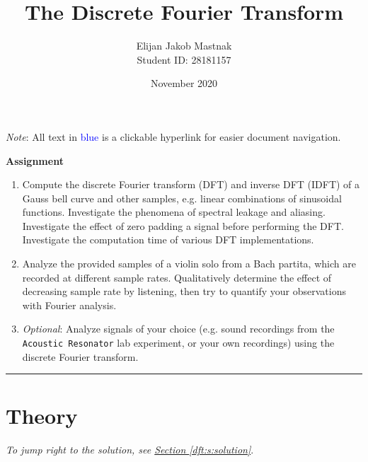 \documentclass[11pt, a4paper]{article}
\begin{document}
\title{The Discrete Fourier Transform}
\author{Elijan Jakob Mastnak\\[1mm]\small{Student ID: 28181157}}
\date{November 2020}
\maketitle

\tableofcontents

\vspace{5mm}
\textit{Note}: All text in \textcolor{blue}{blue} is a clickable hyperlink for easier document navigation.

\newpage
\begin{center}
\textbf{Assignment}
\begin{enumerate}
	\item Compute the discrete Fourier transform (DFT) and inverse DFT (IDFT) of a Gauss bell curve and other samples, e.g. linear combinations of sinusoidal functions. Investigate the phenomena of spectral leakage and aliasing. Investigate the effect of zero padding a signal before performing the DFT. Investigate the computation time of various DFT implementations. 
	
	\item Analyze the provided samples of a violin solo from a Bach partita, which are recorded at different sample rates. Qualitatively determine the effect of decreasing sample rate by listening, then try to quantify your observations with Fourier analysis.
	
	\item \textit{Optional}: Analyze signals of your choice (e.g. sound recordings from the \texttt{Acoustic Resonator} lab experiment, or your own recordings) using the discrete Fourier transform.
\end{enumerate}
\end{center}

\vspace{2mm}

\rule{\textwidth}{0.2pt}


\section{Theory} \label{dft:s:theory}
\vspace{-2mm}
\textit{To jump right to the solution, see \hyperref[dft:s:solution]{Section \ref{dft:s:solution}}}.
\end{document}
